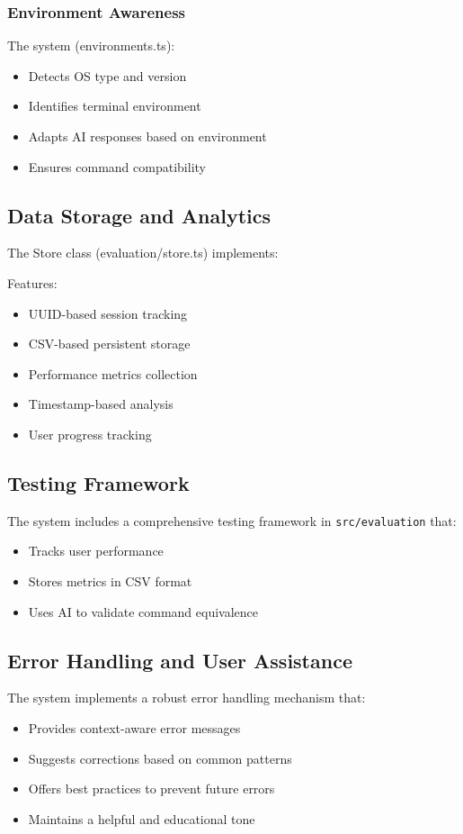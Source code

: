 \subsubsection{Environment Awareness}

The system (environments.ts):
\begin{itemize}
	\item Detects OS type and version
	\item Identifies terminal environment
	\item Adapts AI responses based on environment
	\item Ensures command compatibility
\end{itemize}

\subsection{Data Storage and Analytics}

The Store class (evaluation/store.ts) implements:

Features:
\begin{itemize}
	\item UUID-based session tracking
	\item CSV-based persistent storage
	\item Performance metrics collection
	\item Timestamp-based analysis
	\item User progress tracking
\end{itemize}

\subsection{Testing Framework}

The system includes a comprehensive testing framework in \texttt{src/evaluation} that:
\begin{itemize}
	\item Tracks user performance
	\item Stores metrics in CSV format
	\item Uses AI to validate command equivalence
\end{itemize}

\subsection{Error Handling and User Assistance}

The system implements a robust error handling mechanism that:
\begin{itemize}
	\item Provides context-aware error messages
	\item Suggests corrections based on common patterns
	\item Offers best practices to prevent future errors
	\item Maintains a helpful and educational tone
\end{itemize}

